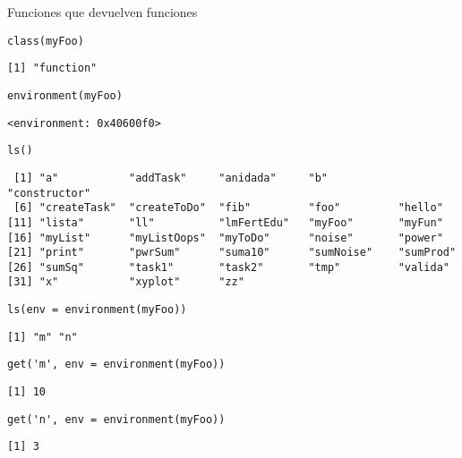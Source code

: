 \documentclass[xcolor={usenames,svgnames,dvipsnames}]{beamer}
\begin{document}
\begin{frame}[fragile,label={sec:orgheadline18}]{Funciones que devuelven funciones}
 \lstset{language=R,label= ,caption= ,captionpos=b,numbers=none}
\begin{lstlisting}
class(myFoo)
\end{lstlisting}

\begin{verbatim}
[1] "function"
\end{verbatim}

\lstset{language=R,label= ,caption= ,captionpos=b,numbers=none}
\begin{lstlisting}
environment(myFoo)
\end{lstlisting}

\begin{verbatim}
<environment: 0x40600f0>
\end{verbatim}

\lstset{language=R,label= ,caption= ,captionpos=b,numbers=none}
\begin{lstlisting}
ls()
\end{lstlisting}

\begin{verbatim}
 [1] "a"           "addTask"     "anidada"     "b"           "constructor"
 [6] "createTask"  "createToDo"  "fib"         "foo"         "hello"      
[11] "lista"       "ll"          "lmFertEdu"   "myFoo"       "myFun"      
[16] "myList"      "myListOops"  "myToDo"      "noise"       "power"      
[21] "print"       "pwrSum"      "suma10"      "sumNoise"    "sumProd"    
[26] "sumSq"       "task1"       "task2"       "tmp"         "valida"     
[31] "x"           "xyplot"      "zz"
\end{verbatim}

\lstset{language=R,label= ,caption= ,captionpos=b,numbers=none}
\begin{lstlisting}
ls(env = environment(myFoo))
\end{lstlisting}

\begin{verbatim}
[1] "m" "n"
\end{verbatim}

\lstset{language=R,label= ,caption= ,captionpos=b,numbers=none}
\begin{lstlisting}
get('m', env = environment(myFoo))
\end{lstlisting}

\begin{verbatim}
[1] 10
\end{verbatim}

\lstset{language=R,label= ,caption= ,captionpos=b,numbers=none}
\begin{lstlisting}
get('n', env = environment(myFoo))
\end{lstlisting}

\begin{verbatim}
[1] 3
\end{verbatim}
\end{frame}
\end{document}
